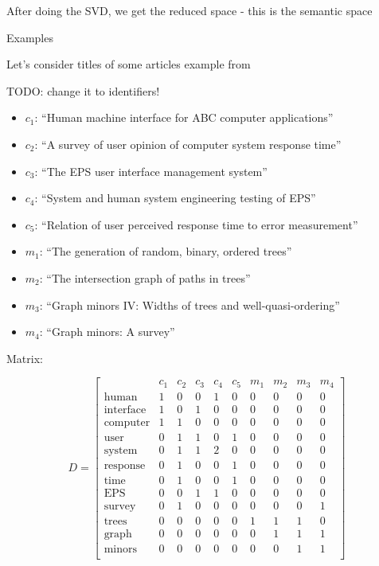 After doing the SVD, we get the reduced space - this is the semantic
space

Examples

Let's consider titles of some articles example from \cite{landauer1998introduction}


TODO: change it to identifiers!

\begin{itemize}
\itemsep1pt\parskip0pt
\item
  $c_1$: ``Human machine interface for ABC computer applications''
\item
  $c_2$: ``A survey of user opinion of computer system response
  time''
\item
  $c_3$: ``The EPS user interface management system''
\item
  $c_4$: ``System and human system engineering testing of EPS''
\item
  $c_5$: ``Relation of user perceived response time to error
  measurement''
\item
  $m_1$: ``The generation of random, binary, ordered trees''
\item
  $m_2$: ``The intersection graph of paths in trees''
\item
  $m_3$: ``Graph minors IV: Widths of trees and well-quasi-ordering''
\item
  $m_4$: ``Graph minors: A survey''
\end{itemize}

Matrix:

$$D =
\left[\begin{array}{c|ccccccccc}
 & c_1 & c_2 & c_3 & c_4 & c_5 & m_1 & m_2 & m_3 & m_4 \\
\hline
\text{human} & 1 & 0 & 0 & 1 & 0 & 0 & 0 & 0 & 0 \\
\text{interface} & 1 & 0 & 1 & 0 & 0 & 0 & 0 & 0 & 0 \\
\text{computer} & 1 & 1 & 0 & 0 & 0 & 0 & 0 & 0 & 0 \\
\text{user} & 0 & 1 & 1 & 0 & 1 & 0 & 0 & 0 & 0 \\
\text{system} & 0 & 1 & 1 & 2 & 0 & 0 & 0 & 0 & 0 \\
\text{response} & 0 & 1 & 0 & 0 & 1 & 0 & 0 & 0 & 0 \\
\text{time} & 0 & 1 & 0 & 0 & 1 & 0 & 0 & 0 & 0 \\
\text{EPS} & 0 & 0 & 1 & 1 & 0 & 0 & 0 & 0 & 0 \\
\text{survey} & 0 & 1 & 0 & 0 & 0 & 0 & 0 & 0 & 1 \\
\text{trees} & 0 & 0 & 0 & 0 & 0 & 1 & 1 & 1 & 0 \\
\text{graph} & 0 & 0 & 0 & 0 & 0 & 0 & 1 & 1 & 1 \\
\text{minors} & 0 & 0 & 0 & 0 & 0 & 0 & 0 & 1 & 1 \\
\end{array} \right] $$

